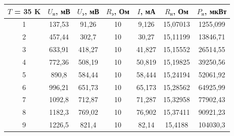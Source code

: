 \documentclass[a4paper, 12pt]{article} %
\begin{document}
\begin{center}
\begin{tabular}{|c|c|c|c|c|c|c|}
\hline
\textbf{$T$ = 35 K} & $U_\text{н}$, мВ & $U_\text{э}$, мВ & $R_\text{э}$, Ом & $I$, мА & $R_\text{н}$, Ом & $P_\text{н}$, мкВт \\ \hline
1                   & 137,53           & 91,26           & 10               & 9,126   & 15,07013         & 1255,099         \\ \hline
2                   & 457,44           & 302,7           & 10               & 30,27   & 15,11199         & 13846,71         \\ \hline
3                   & 633,91           & 418,27          & 10               & 41,827  & 15,15552         & 26514,55         \\ \hline
4                   & 772,36           & 508,19          & 10               & 50,819  & 15,19825         & 39250,56         \\ \hline
5                   & 890,8            & 584,44          & 10               & 58,444  & 15,24194         & 52061,92         \\ \hline
6                   & 996,21           & 651,73          & 10               & 65,173  & 15,28562         & 64925,99         \\ \hline
7                   & 1092,8           & 712,87          & 10               & 71,287  & 15,32958         & 77902,43         \\ \hline
8                   & 1182,3           & 769,02          & 10               & 76,902  & 15,37411         & 90921,23         \\ \hline
9                   & 1226,5           & 821,4           & 10               & 82,14   & 15,4188          & 104030,3         \\ \hline
\end{tabular}
\end{center}
\end{document}
